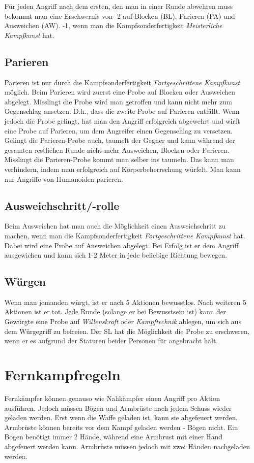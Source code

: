 Für jeden Angriff nach dem ersten, den man in einer Runde abwehren muss bekommt man eine Erschwernis von -2 auf Blocken (BL), Parieren (PA) und Ausweichen (AW). -1, wenn man die Kampfsonderfertigkeit \textit{Meisterliche Kampfkunst} hat.

\subsection{Parieren}
Parieren ist nur durch die Kampfsonderfertigkeit \textit{Fortgeschrittene Kampfkunst} möglich. Beim Parieren wird zuerst eine Probe auf Blocken oder Ausweichen abgelegt. Misslingt die Probe wird man getroffen und kann nicht mehr zum Gegenschlag ansetzen. D.h., dass die zweite Probe auf Parieren entfällt. Wenn jedoch die Probe gelingt, hat man den Angriff erfolgreich abgewehrt und wirft eine Probe auf Parieren, um dem Angreifer einen Gegenschlag zu versetzen. Gelingt die Parieren-Probe auch, taumelt der Gegner und kann während der gesamten restlichen Runde nicht mehr Ausweichen, Blocken oder Parieren. Misslingt die Parieren-Probe kommt man selber ins taumeln. Das kann man verhindern, indem man erfolgreich auf Körperbeherrschung würfelt. Man kann nur Angriffe von Humanoiden parieren.

\subsection{Ausweichschritt/-rolle}
Beim Ausweichen hat man auch die Möglichkeit einen Ausweichschritt zu machen, wenn man die Kampfsonderfertigkeit \textit{Fortgeschrittene Kampfkunst} hat. Dabei wird eine Probe auf Ausweichen abgelegt. Bei Erfolg ist er dem Angriff ausgewichen und kann sich 1-2 Meter in jede beliebige Richtung bewegen.

\subsection{Würgen}
Wenn man jemanden würgt, ist er nach 5 Aktionen bewusstlos. Nach weiteren 5 Aktionen ist er tot. Jede Runde (solange er bei Bewusstsein ist) kann der Gewürgte eine Probe auf \textit{Willenskraft} oder \textit{Kampftechnik} ablegen, um sich aus dem Würgegriff zu befreien. Der SL hat die Möglichkeit die Probe zu erschweren, wenn er es aufgrund der Staturen beider Personen für angebracht hält.

\section{Fernkampfregeln}
\label{chap:fernkampfregeln}
Fernkämpfer können genauso wie Nahkämpfer einen Angriff pro Aktion ausführen. Jedoch müssen Bögen und Armbrüste nach jedem Schuss wieder geladen werden. Erst wenn die Waffe geladen ist, kann sie abgefeuert werden. Armbrüste können bereits vor dem Kampf geladen werden - Bögen nicht. Ein Bogen benötigt immer 2 Hände, während eine Armbrust mit einer Hand abgefeuert werden kann. Armbrüste müssen jedoch mit zwei Händen nachgeladen werden. 

